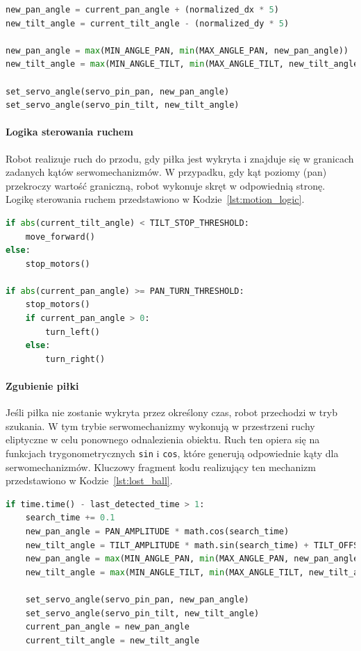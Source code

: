 \documentclass[a4paper,twoside,12pt]{book}
\begin{document}
\begin{lstlisting}[language=Python, caption={Algorytm sterowania serwomechanizmami.}, label={lst:servo_control}, captionpos=b]
new_pan_angle = current_pan_angle + (normalized_dx * 5)
new_tilt_angle = current_tilt_angle - (normalized_dy * 5)

new_pan_angle = max(MIN_ANGLE_PAN, min(MAX_ANGLE_PAN, new_pan_angle))
new_tilt_angle = max(MIN_ANGLE_TILT, min(MAX_ANGLE_TILT, new_tilt_angle))

set_servo_angle(servo_pin_pan, new_pan_angle)
set_servo_angle(servo_pin_tilt, new_tilt_angle)
\end{lstlisting}

\paragraph{Logika sterowania ruchem}
Robot realizuje ruch do przodu, gdy piłka jest wykryta i znajduje się w granicach zadanych kątów serwomechanizmów. W przypadku, gdy kąt poziomy (pan) przekroczy wartość graniczną, robot wykonuje skręt w odpowiednią stronę. Logikę sterowania ruchem przedstawiono w Kodzie~\ref{lst:motion_logic}.

\begin{lstlisting}[language=Python, caption={Logika sterowania ruchem robota.}, label={lst:motion_logic}, captionpos=b]
if abs(current_tilt_angle) < TILT_STOP_THRESHOLD:
    move_forward()
else:
    stop_motors()

if abs(current_pan_angle) >= PAN_TURN_THRESHOLD:
    stop_motors()
    if current_pan_angle > 0:
        turn_left()
    else:
        turn_right()
\end{lstlisting}

\paragraph{Zgubienie piłki}
Jeśli piłka nie zostanie wykryta przez określony czas, robot przechodzi w tryb szukania. W tym trybie serwomechanizmy wykonują w przestrzeni ruchy eliptyczne w celu ponownego odnalezienia obiektu. Ruch ten opiera się na funkcjach trygonometrycznych \texttt{sin} i \texttt{cos}, które generują odpowiednie kąty dla serwomechanizmów. Kluczowy fragment kodu realizujący ten mechanizm przedstawiono w Kodzie~\ref{lst:lost_ball}.

\begin{lstlisting}[language=Python, caption={Logika zgubienia piłki i ruchu eliptycznego.}, label={lst:lost_ball}, captionpos=b]
if time.time() - last_detected_time > 1:
    search_time += 0.1
    new_pan_angle = PAN_AMPLITUDE * math.cos(search_time)
    new_tilt_angle = TILT_AMPLITUDE * math.sin(search_time) + TILT_OFFSET
    new_pan_angle = max(MIN_ANGLE_PAN, min(MAX_ANGLE_PAN, new_pan_angle))
    new_tilt_angle = max(MIN_ANGLE_TILT, min(MAX_ANGLE_TILT, new_tilt_angle))

    set_servo_angle(servo_pin_pan, new_pan_angle)
    set_servo_angle(servo_pin_tilt, new_tilt_angle)
    current_pan_angle = new_pan_angle
    current_tilt_angle = new_tilt_angle
\end{lstlisting}
\end{document}
